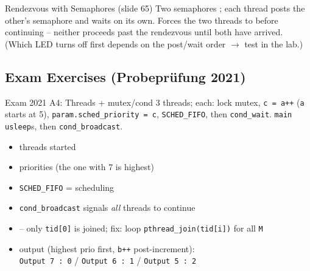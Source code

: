 \begin{example2}{Rendezvous with Semaphores (slide 65)}
    Two semaphores ; each thread posts the
    other's semaphore and waits on its own.
    \tcblower
    Forces the two threads to  before continuing --
    neither proceeds past the rendezvous until both have arrived. (Which LED turns
    off first depends on the post/wait order $\to$ test in the lab.)
\end{example2}

\multend

\subsection{Exam Exercises (Probepr\"ufung 2021)}

\begin{example2}{Exam 2021 A4: Threads + mutex/cond}
    3 threads; each: lock mutex, \texttt{c = a++} (\texttt{a} starts at 5),
    \texttt{param.sched\_priority = c}, \texttt{SCHED\_FIFO}, then \texttt{cond\_wait}.
    \texttt{main} \texttt{usleep}s, then \texttt{cond\_broadcast}.
    \tcblower
    \begin{itemize}
        \item {}  threads started
        \item {} priorities  (the one with 7 is highest)
        \item {} \texttt{SCHED\_FIFO} =  scheduling
        \item {} \texttt{cond\_broadcast} signals \emph{all} threads to continue
        \item {}  -- only \texttt{tid[0]} is joined; fix: loop
              \texttt{pthread\_join(tid[i])} for all \texttt{M}
        \item {} output (highest prio first, \texttt{b++} post-increment):\\
              \texttt{Output 7 : 0} / \texttt{Output 6 : 1} / \texttt{Output 5 : 2}
    \end{itemize}
\end{example2}

